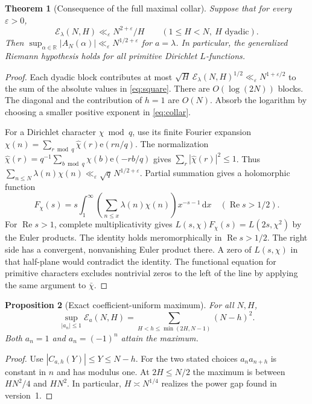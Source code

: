 \documentclass[11pt]{amsart}
\newtheorem{theorem}{Theorem}[section]
\newtheorem{proposition}[theorem]{Proposition}
\theoremstyle{definition}
\theoremstyle{remark}
\newcommand{\E}{\mathcal E}
\newcommand{\ee}{\mathrm e}
\newcommand{\R}{\operatorname{Re}}
\newcommand{\dd}{\,\mathrm d}
\numberwithin{equation}{section}
\begin{document}
\begin{theorem}[Consequence of the full maximal collar]\label{thm:grh}
Suppose that for every \(\varepsilon>0\),
\begin{equation}\label{eq:collar}
 \E_\lambda(N,H)\ll_\varepsilon N^{2+\varepsilon}/H
 \qquad(1\le H<N,\ H\text{ dyadic}).
\end{equation}
Then \(\sup_{\alpha\in\mathbb R}|A_N(\alpha)|\ll_\varepsilon N^{1/2+\varepsilon}\) for \(a=\lambda\). In particular, the generalized Riemann hypothesis holds for all primitive Dirichlet \(L\)-functions.
\end{theorem}
\begin{proof}
Each dyadic block contributes at most
\(\sqrt H\,\E_\lambda(N,H)^{1/2}\ll_\varepsilon N^{1+\varepsilon/2}\)
to the sum of the absolute values in \eqref{eq:square}. There are \(O(\log(2N))\) blocks. The diagonal and the contribution of \(h=1\) are \(O(N)\). Absorb the logarithm by choosing a smaller positive exponent in \eqref{eq:collar}.

For a Dirichlet character \(\chi\bmod q\), use its finite Fourier expansion \(\chi(n)=\sum_{r\bmod q}\widehat\chi(r)\ee(rn/q)\). The normalization \(\widehat\chi(r)=q^{-1}\sum_{b\bmod q}\chi(b)\ee(-rb/q)\) gives \(\sum_r|\widehat\chi(r)|^2\le1\). Thus \(\sum_{n\le N}\lambda(n)\chi(n)\ll_\varepsilon\sqrt q\,N^{1/2+\varepsilon}\). Partial summation gives a holomorphic function
\[
 F_\chi(s)=s\int_1^\infty\left(\sum_{n\le x}\lambda(n)\chi(n)\right)x^{-s-1}\dd x
 \quad(\R s>1/2).
\]
For \(\R s>1\), complete multiplicativity gives
\(L(s,\chi)F_\chi(s)=L(2s,\chi^2)\) by the Euler products. The identity holds meromorphically in \(\R s>1/2\). The right side has a convergent, nonvanishing Euler product there. A zero of \(L(s,\chi)\) in that half-plane would contradict the identity. The functional equation for primitive characters excludes nontrivial zeros to the left of the line by applying the same argument to \(\bar\chi\).
\end{proof}

\begin{proposition}[Exact coefficient-uniform maximum]\label{prop:uniform}
For all \(N,H\),
\[
 \sup_{|a_n|\le1}\E_a(N,H)=
 \sum_{H<h\le\min(2H,N-1)}(N-h)^2.
\]
Both \(a_n=1\) and \(a_n=(-1)^n\) attain the maximum.
\end{proposition}
\begin{proof}
Use \(|C_{a,h}(Y)|\le Y\le N-h\). For the two stated choices \(a_na_{n+h}\) is constant in \(n\) and has modulus one. At \(2H\le N/2\) the maximum is between \(HN^2/4\) and \(HN^2\). In particular, \(H\asymp N^{1/4}\) realizes the power gap found in version~1.
\end{proof}
\end{document}
